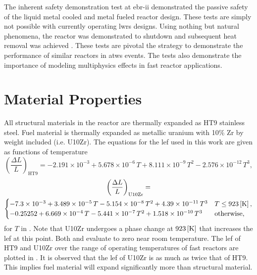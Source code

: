   The inherent safety demonstration test at \gls{ebr-ii} demonstrated the
  passive safety of the liquid metal cooled and metal fueled reactor design.
  These tests are simply not possible with currently operating \glspl{lwr}
  designs. Using nothing but natural phenomena, the reactor was demonstrated to
  shutdown and subsequent heat removal was achieved \cite{ebriitests}. These
  tests are pivotal the strategy to demonstrate the performance of similar
  reactors in \gls{atws} events. The tests also demonstrate the importance of 
  modeling multiphysics effects in fast reactor applications.

\section{Material Properties}
  \label{sec:model_details__material_properties}
  All structural materials in the reactor are thermally expanded as HT9
  stainless steel. Fuel material is thermally expanded as metallic uranium
  with 10\% Zr by weight included (i.e. U10Zr). The equations for the
  \gls{lef} used in this work are given as functions of temperature
  \begin{equation}
    \label{eq:lef_ht9}
    \left( \frac{\Delta L}{L} \right)_{\text{HT9}} = 
      -2.191 \times 10^{-3} + 5.678 \times 10^{-6} \, T + 
      8.111 \times 10^{-9} \, T^2 - 2.576 \times 10^{-12} \, T^3 ,
  \end{equation}
  \begin{multline}
    \label{eq:lef_u10zr}
    \left( \frac{\Delta L}{L} \right)_{\text{U10Zr}} = \\
      \begin{cases}
        -7.3 \times 10^{-3} + 3.489 \times 10^{-5} \, T 
          - 5.154 \times 10^{-8} \, T^2 + 4.39 \times 10^{-11} \, T^3 & 
          T \le 923 \left[\text{{K}}\right], \\
        -0.25252 + 6.669 \times 10^{-4} \, T - 5.441 \times 10^{-7} \, T^2 
          + 1.518 \times 10^{-10} \, T^3 & \text{otherwise},
      \end{cases}
  \end{multline}
  for $T$ in  \cite{ht9Prop,thexpU10Zr}. Note that U10Zr undergoes a
  phase change at $923 \left[\text{{K}}\right]$ that increases the \gls{lef} at this point.
  Both  and  evaluate to zero near room
  temperature. The \gls{lef} of HT9 and U10Zr over the range of operating
  temperatures of fast reactors are plotted in . It is
  observed that the \gls{lef} of U10Zr is as much as twice that of HT9. This
  implies fuel material will expand significantly more than structural
  material.

